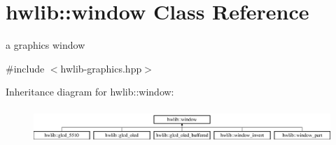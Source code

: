 \hypertarget{classhwlib_1_1window}{}\section{hwlib\+:\+:window Class Reference}
\label{classhwlib_1_1window}


a graphics window  




{\ttfamily \#include $<$hwlib-\/graphics.\+hpp$>$}

Inheritance diagram for hwlib\+:\+:window\+:\begin{figure}[H]
\begin{center}
\leavevmode
\includegraphics[height=1.357576cm]{classhwlib_1_1window}
\end{center}
\end{figure}

